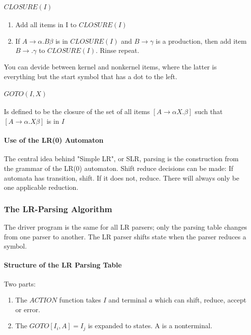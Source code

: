 \documentclass{article}
\begin{document}
\paragraph{$CLOSURE(I)$} %
\label{par:$CLOSURE(I)$}
\begin{enumerate}
	\item Add all items in I to $CLOSURE(I)$
	\item If $A \to \alpha .B \beta$ is in $CLOSURE(I)$ and $B \to \gamma$ is a production, then add item $B \to . \gamma$ to $CLOSURE(I)$. Rinse repeat.
\end{enumerate}
You can devide between kernel and nonkernel items, where the latter is everything but the start symbol that has a dot to the left.

\paragraph{$GOTO(I,X)$} %
\label{par:$GOTO(I,X)$}
Is defined to be the closure of the set of all items $[A \to \alpha X.\beta]$ such that $[A \to \alpha .X\beta]$ is in $I$

\paragraph{Use of the LR(0) Automaton} %
\label{par:Use of the LR(0) Automaton}
The central idea behind "Simple LR", or SLR, parsing is the construction from the grammar of the LR(0) automaton. Shift reduce decisions can be made: If automata has transition, shift. If it does not, reduce. There will always only be one applicable reduction.


\subsubsection{The LR-Parsing Algorithm} %
\label{ssub:The LR-Parsing Algorithm}
The driver program is the same for all LR parsers; only the parsing table changes from one parser to another. The LR parser shifts state when the parser reduces a symbol.

\paragraph{Structure of the LR Parsing Table} %
\label{par:Structure of the LR Parsing Table}
Two parts:
\begin{enumerate}
	\item The $ACTION$ function takes $I$ and terminal $a$ which can shift, reduce, accept or error.
	\item The $GOTO[I_i,A] = I_j$ is expanded to states. A is a nonterminal.
\end{enumerate}
\end{document}
